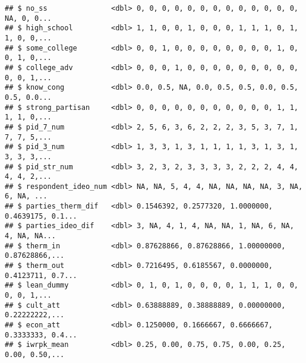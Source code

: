 \documentclass[
]{article}
\newenvironment{Shaded}{\begin{snugshade}}{\end{snugshade}}
\newcommand{\CommentTok}[1]{\textcolor[rgb]{0.56,0.35,0.01}{\textit{#1}}}
\newcommand{\DataTypeTok}[1]{\textcolor[rgb]{0.13,0.29,0.53}{#1}}
\newcommand{\DecValTok}[1]{\textcolor[rgb]{0.00,0.00,0.81}{#1}}
\newcommand{\KeywordTok}[1]{\textcolor[rgb]{0.13,0.29,0.53}{\textbf{#1}}}
\newcommand{\NormalTok}[1]{#1}
\newcommand{\OperatorTok}[1]{\textcolor[rgb]{0.81,0.36,0.00}{\textbf{#1}}}
\newcommand{\StringTok}[1]{\textcolor[rgb]{0.31,0.60,0.02}{#1}}
\begin{document}
\begin{verbatim}
## $ no_ss               <dbl> 0, 0, 0, 0, 0, 0, 0, 0, 0, 0, 0, 0, 0, NA, 0, 0...
## $ high_school         <dbl> 1, 1, 0, 0, 1, 0, 0, 0, 1, 1, 1, 0, 1, 1, 0, 0,...
## $ some_college        <dbl> 0, 0, 1, 0, 0, 0, 0, 0, 0, 0, 0, 1, 0, 0, 1, 0,...
## $ college_adv         <dbl> 0, 0, 0, 1, 0, 0, 0, 0, 0, 0, 0, 0, 0, 0, 0, 1,...
## $ know_cong           <dbl> 0.0, 0.5, NA, 0.0, 0.5, 0.5, 0.0, 0.5, 0.5, 0.0...
## $ strong_partisan     <dbl> 0, 0, 0, 0, 0, 0, 0, 0, 0, 0, 0, 1, 1, 1, 1, 0,...
## $ pid_7_num           <dbl> 2, 5, 6, 3, 6, 2, 2, 2, 3, 5, 3, 7, 1, 7, 7, 5,...
## $ pid_3_num           <dbl> 1, 3, 3, 1, 3, 1, 1, 1, 1, 3, 1, 3, 1, 3, 3, 3,...
## $ pid_str_num         <dbl> 3, 2, 3, 2, 3, 3, 3, 3, 2, 2, 2, 4, 4, 4, 4, 2,...
## $ respondent_ideo_num <dbl> NA, NA, 5, 4, 4, NA, NA, NA, NA, 3, NA, 6, NA, ...
## $ parties_therm_dif   <dbl> 0.1546392, 0.2577320, 1.0000000, 0.4639175, 0.1...
## $ parties_ideo_dif    <dbl> 3, NA, 4, 1, 4, NA, NA, 1, NA, 6, NA, 4, NA, NA...
## $ therm_in            <dbl> 0.87628866, 0.87628866, 1.00000000, 0.87628866,...
## $ therm_out           <dbl> 0.7216495, 0.6185567, 0.0000000, 0.4123711, 0.7...
## $ lean_dummy          <dbl> 0, 1, 0, 1, 0, 0, 0, 0, 1, 1, 1, 0, 0, 0, 0, 1,...
## $ cult_att            <dbl> 0.63888889, 0.38888889, 0.00000000, 0.22222222,...
## $ econ_att            <dbl> 0.1250000, 0.1666667, 0.6666667, 0.3333333, 0.4...
## $ iwrpk_mean          <dbl> 0.25, 0.00, 0.75, 0.75, 0.00, 0.25, 0.00, 0.50,...
\end{verbatim}

\begin{Shaded}
\end{Shaded}
\end{document}

